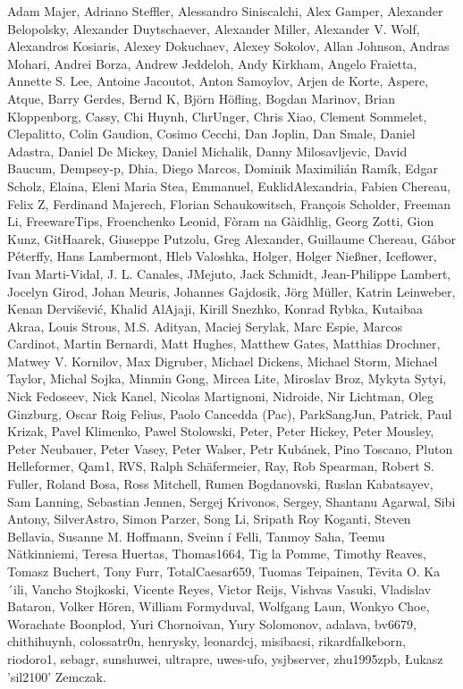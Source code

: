 Adam Majer, Adriano Steffler, Alessandro Siniscalchi, Alex Gamper,
Alexander Belopolsky, Alexander Duytschaever, Alexander Miller,
Alexander V. Wolf, Alexandros Kosiaris, Alexey Dokuchaev, Alexey
Sokolov, Allan Johnson, Andras Mohari, Andrei Borza, Andrew Jeddeloh,
Andy Kirkham, Angelo Fraietta, Annette S. Lee, Antoine Jacoutot, Anton
Samoylov, Arjen de Korte, Aspere, Atque, Barry Gerdes, Bernd K, Björn
Höfling, Bogdan Marinov, Brian Kloppenborg, Cassy, Chi Huynh,
ChrUnger, Chris Xiao, Clement Sommelet, Clepalitto, Colin Gaudion,
Cosimo Cecchi, Dan Joplin, Dan Smale, Daniel Adastra, Daniel De
Mickey, Daniel Michalik, Danny Milosavljevic, David Baucum, Dempsey-p,
Dhia, Diego Marcos, Dominik Maximilián Ramík, Edgar Scholz, Elaina,
Eleni Maria Stea, Emmanuel, EuklidAlexandria, Fabien Chereau, Felix Z,
Ferdinand Majerech, Florian Schaukowitsch, François Scholder, Freeman
Li, FreewareTips, Froenchenko Leonid, Fòram na Gàidhlig, Georg Zotti,
Gion Kunz, GitHaarek, Giuseppe Putzolu, Greg Alexander, Guillaume
Chereau, Gábor Péterffy, Hans Lambermont, Hleb Valoshka, Holger,
Holger Nießner, Iceflower, Ivan Marti-Vidal, J. L. Canales, JMejuto,
Jack Schmidt, Jean-Philippe Lambert, Jocelyn Girod, Johan Meuris,
Johannes Gajdosik, Jörg Müller, Katrin Leinweber, Kenan Dervišević,
Khalid AlAjaji, Kirill Snezhko, Konrad Rybka, Kutaibaa Akraa, Louis
Strous, M.S. Adityan, Maciej Serylak, Marc Espie, Marcos Cardinot,
Martin Bernardi, Matt Hughes, Matthew Gates, Matthias Drochner, Matwey
V. Kornilov, Max Digruber, Michael Dickens, Michael Storm, Michael
Taylor, Michal Sojka, Minmin Gong, Mircea Lite, Miroslav Broz, Mykyta
Sytyi, Nick Fedoseev, Nick Kanel, Nicolas Martignoni, Nidroide, Nir
Lichtman, Oleg Ginzburg, Oscar Roig Felius, Paolo Cancedda (Pac),
ParkSangJun, Patrick, Paul Krizak, Pavel Klimenko, Pawel Stolowski,
Peter, Peter Hickey, Peter Mousley, Peter Neubauer, Peter Vasey, Peter
Walser, Petr Kubánek, Pino Toscano, Pluton Helleformer, Qam1, RVS,
Ralph Schäfermeier, Ray, Rob Spearman, Robert S. Fuller, Roland Bosa,
Ross Mitchell, Rumen Bogdanovski, Ruslan Kabatsayev, Sam Lanning,
Sebastian Jennen, Sergej Krivonos, Sergey, Shantanu Agarwal, Sibi
Antony, SilverAstro, Simon Parzer, Song Li, Sripath Roy Koganti,
Steven Bellavia, Susanne M. Hoffmann, Sveinn í Felli, Tanmoy Saha,
Teemu Nätkinniemi, Teresa Huertas, Thomas1664, Tig la Pomme, Timothy
Reaves, Tomasz Buchert, Tony Furr, TotalCaesar659, Tuomas Teipainen,
Tēvita O. Ka´ili, Vancho Stojkoski, Vicente Reyes, Victor Reijs,
Vishvas Vasuki, Vladislav Bataron, Volker Hören, William
Formyduval, Wolfgang Laun, Wonkyo Choe, Worachate Boonplod, Yuri
Chornoivan, Yury Solomonov, adalava, bv6679, chithihuynh, colossatr0n,
henrysky, leonardcj, misibacsi, rikardfalkeborn, riodoro1, sebagr,
sunshuwei, ultrapre, uwes-ufo, ysjbserver, zhu1995zpb, Łukasz
'sil2100' Zemczak.

